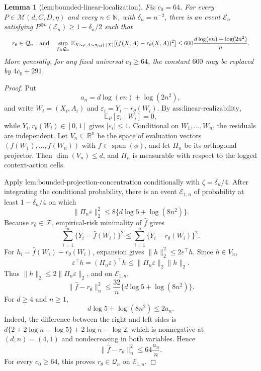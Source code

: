 \documentclass{article}
\newtheorem{lemma}{Lemma}
\begin{document}
\begin{lemma}[lem:bounded-linear-localization]\label{lem:bounded-linear-localization}
Fix \(c_0=64\). For every \(P\in\mathcal M(d,C,D,\eta)\) and every \(n\in\mathbb N\), with \(\delta_n=n^{-2}\), there is an event \(\mathcal E_n\) satisfying \(P^{\otimes n}(\mathcal E_n)\ge1-\delta_n/2\) such that
\[
\makebox[\linewidth][c]{\resizebox{0.98\linewidth}{!}{\(\displaystyle r_\theta\in\mathcal Q_n
\quad\text{and}\quad
\sup_{f\in\mathcal Q_n}\mathbb E_{X\sim\rho,A\sim\pi_{\mathrm{ref}}(\cdot\mid X)}[(f(X,A)-r_\theta(X,A))^2]
\le600\frac{d\log(en)+\log(2n^2)}{n}.\)}}
\]
More generally, for any fixed universal \(c_0\ge64\), the constant \(600\) may be replaced by \(4c_0+291\).
\end{lemma}
\begin{proof}
Put
\[
a_n=d\log(en)+\log(2n^2),
\]
and write \(W_i=(X_i,A_i)\) and \(\varepsilon_i=Y_i-r_\theta(W_i)\). By \(\text{ass:linear-realizability}\),
\[
\mathbb E_P[\varepsilon_i\mid W_i]=0,
\]
while \(Y_i,r_\theta(W_i)\in[0,1]\) gives \(|\varepsilon_i|\le1\). Conditional on \(W_1,\ldots,W_n\), the residuals are independent. Let \(V_n\subseteq\mathbb R^n\) be the space of evaluation vectors \((f(W_1),\ldots,f(W_n))\) with \(f\in\operatorname{span}(\phi)\), and let \(\Pi_n\) be its orthogonal projector. Then \(\dim(V_n)\le d\), and \(\Pi_n\) is measurable with respect to the logged context-action cells.

Apply \(\text{lem:bounded-projection-concentration}\) conditionally with \(\zeta=\delta_n/4\). After integrating the conditional probability, there is an event \(\mathcal E_{1,n}\) of probability at least \(1-\delta_n/4\) on which
\[
\|\Pi_n\varepsilon\|_2^2\le8\{d\log5+\log(8n^2)\}.
\]
Because \(r_\theta\in\mathcal F\), empirical-risk minimality of \(\widehat f\) gives
\[
\sum_{i=1}^n\{Y_i-\widehat f(W_i)\}^2
\le\sum_{i=1}^n\{Y_i-r_\theta(W_i)\}^2.
\]
For \(h_i=\widehat f(W_i)-r_\theta(W_i)\), expansion gives \(\|h\|_2^2\le2\varepsilon^\top h\). Since \(h\in V_n\),
\[
\varepsilon^\top h=(\Pi_n\varepsilon)^\top h
\le\|\Pi_n\varepsilon\|_2\|h\|_2.
\]
Thus \(\|h\|_2\le2\|\Pi_n\varepsilon\|_2\), and on \(\mathcal E_{1,n}\),
\[
\|\widehat f-r_\theta\|_n^2
\le\frac{32}{n}\{d\log5+\log(8n^2)\}.
\]
For \(d\ge4\) and \(n\ge1\),
\[
d\log5+\log(8n^2)\le2a_n.
\]
Indeed, the difference between the right and left sides is \(d\{2+2\log n-\log5\}+2\log n-\log2\), which is nonnegative at \((d,n)=(4,1)\) and nondecreasing in both variables. Hence
\[
\|\widehat f-r_\theta\|_n^2\le64\frac{a_n}{n}.
\]
For every \(c_0\ge64\), this proves \(r_\theta\in\mathcal Q_n\) on \(\mathcal E_{1,n}\).


\end{proof}
\end{document}
